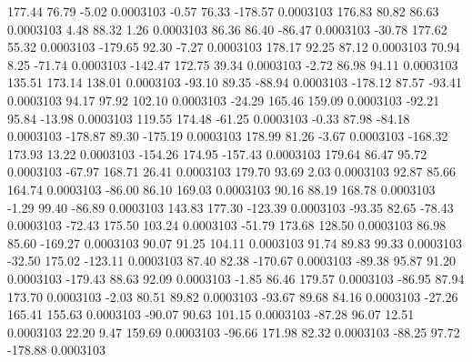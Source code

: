       177.44       76.79       -5.02     0.0003103
       -0.57       76.33     -178.57     0.0003103
      176.83       80.82       86.63     0.0003103
        4.48       88.32        1.26     0.0003103
       86.36       86.40      -86.47     0.0003103
      -30.78      177.62       55.32     0.0003103
     -179.65       92.30       -7.27     0.0003103
      178.17       92.25       87.12     0.0003103
       70.94        8.25      -71.74     0.0003103
     -142.47      172.75       39.34     0.0003103
       -2.72       86.98       94.11     0.0003103
      135.51      173.14      138.01     0.0003103
      -93.10       89.35      -88.94     0.0003103
     -178.12       87.57      -93.41     0.0003103
       94.17       97.92      102.10     0.0003103
      -24.29      165.46      159.09     0.0003103
      -92.21       95.84      -13.98     0.0003103
      119.55      174.48      -61.25     0.0003103
       -0.33       87.98      -84.18     0.0003103
     -178.87       89.30     -175.19     0.0003103
      178.99       81.26       -3.67     0.0003103
     -168.32      173.93       13.22     0.0003103
     -154.26      174.95     -157.43     0.0003103
      179.64       86.47       95.72     0.0003103
      -67.97      168.71       26.41     0.0003103
      179.70       93.69        2.03     0.0003103
       92.87       85.66      164.74     0.0003103
      -86.00       86.10      169.03     0.0003103
       90.16       88.19      168.78     0.0003103
       -1.29       99.40      -86.89     0.0003103
      143.83      177.30     -123.39     0.0003103
      -93.35       82.65      -78.43     0.0003103
      -72.43      175.50      103.24     0.0003103
      -51.79      173.68      128.50     0.0003103
       86.98       85.60     -169.27     0.0003103
       90.07       91.25      104.11     0.0003103
       91.74       89.83       99.33     0.0003103
      -32.50      175.02     -123.11     0.0003103
       87.40       82.38     -170.67     0.0003103
      -89.38       95.87       91.20     0.0003103
     -179.43       88.63       92.09     0.0003103
       -1.85       86.46      179.57     0.0003103
      -86.95       87.94      173.70     0.0003103
       -2.03       80.51       89.82     0.0003103
      -93.67       89.68       84.16     0.0003103
      -27.26      165.41      155.63     0.0003103
      -90.07       90.63      101.15     0.0003103
      -87.28       96.07       12.51     0.0003103
       22.20        9.47      159.69     0.0003103
      -96.66      171.98       82.32     0.0003103
      -88.25       97.72     -178.88     0.0003103
